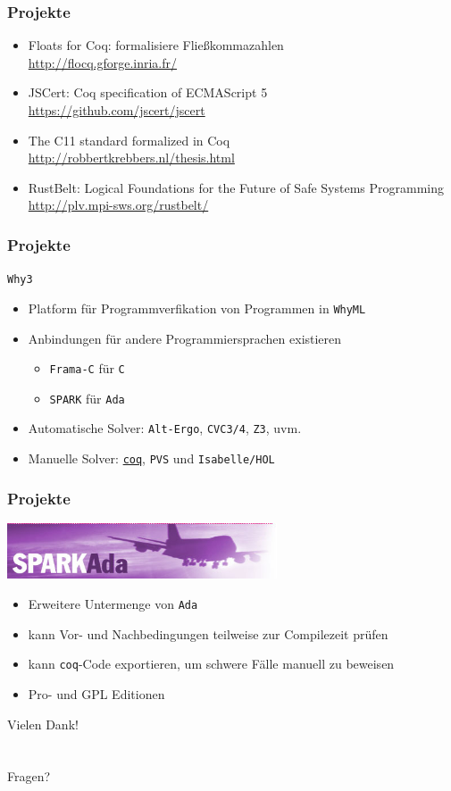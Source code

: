 \documentclass[aspectratio=169]{beamer}
\begin{document}
\begin{frame}
  \frametitle{Projekte}
  \begin{itemize}
  \item Floats for Coq: formalisiere Fließkommazahlen\\
    \qquad \url{http://flocq.gforge.inria.fr/}
  \item JSCert: Coq specification of ECMAScript 5\\
    \qquad \url{https://github.com/jscert/jscert}
  \item The C11 standard formalized in Coq\\
    \qquad \url{http://robbertkrebbers.nl/thesis.html}
  \item RustBelt: Logical Foundations for the Future of Safe Systems Programming\\
    \qquad \url{http://plv.mpi-sws.org/rustbelt/}
  \end{itemize}
\end{frame}
\begin{frame}
  \frametitle{Projekte}
  \begin{center}
    \Large{\texttt{Why3}}
  \end{center}
  \begin{itemize}
  \item Platform für Programmverfikation von Programmen in \texttt{WhyML}
  \item Anbindungen für andere Programmiersprachen existieren
    \begin{itemize}
    \item \texttt{Frama-C} für \texttt{C}
    \item \texttt{SPARK} für \texttt{Ada}
    \end{itemize}
  \item Automatische Solver: \texttt{Alt-Ergo}, \texttt{CVC3/4}, \texttt{Z3}, uvm. 
  \item Manuelle Solver: \underline{\texttt{coq}}, \texttt{PVS} und \texttt{Isabelle/HOL}
  \end{itemize}
\end{frame}
\begin{frame}
  \frametitle{Projekte}
  \begin{center}
    \includegraphics[width=8.0cm]{spark_logo.jpg}    
  \end{center}
  \begin{itemize}
  \item Erweitere Untermenge von \texttt{Ada}
  \item kann Vor- und Nachbedingungen teilweise zur Compilezeit prüfen
  \item kann \texttt{coq}-Code exportieren, um schwere Fälle manuell zu beweisen
  \item Pro- und GPL Editionen
  \end{itemize}
\end{frame}
\begin{frame}
  \begin{center}
    \Huge{Vielen Dank!}\\
    ~\\
    ~\\
    \Large{Fragen?}
  \end{center}
\end{frame}
\end{document}
